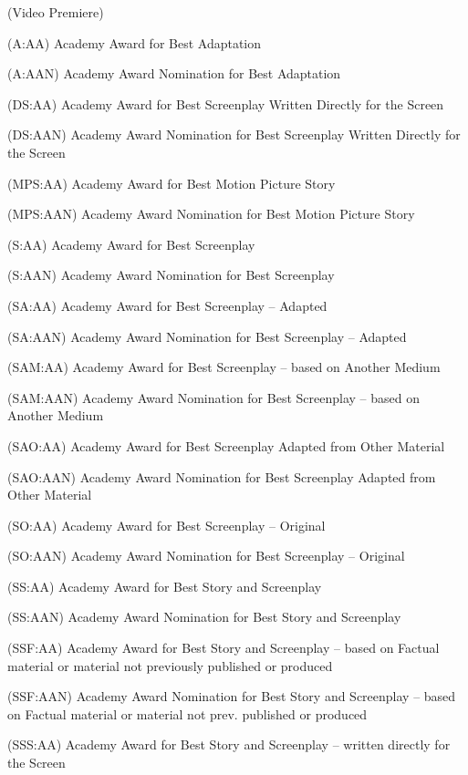 \begin{Ventry}{(Video Premiere)}
\item[(A:AA)]      Academy Award for Best Adaptation
\item[(A:AAN)]     Academy Award Nomination for Best Adaptation
\item[(DS:AA)]     Academy Award for Best Screenplay Written Directly
 for the Screen
\item[(DS:AAN)]    Academy Award Nomination for Best Screenplay Written  
Directly for the Screen
\item[(MPS:AA)]    Academy Award for Best Motion Picture Story
\item[(MPS:AAN)]   Academy Award Nomination for Best Motion Picture Story
\item[(S:AA)]      Academy Award for Best Screenplay
\item[(S:AAN)]     Academy Award Nomination for Best Screenplay
\item[(SA:AA)]     Academy Award for Best Screenplay -- Adapted
\item[(SA:AAN)]    Academy Award Nomination for Best Screenplay -- Adapted
\item[(SAM:AA)]    Academy Award for Best Screenplay -- based on Another Medium
\item[(SAM:AAN)]   Academy Award Nomination for Best Screenplay 
-- based on Another Medium
\item[(SAO:AA)]    Academy Award for Best Screenplay Adapted from Other Material
\item[(SAO:AAN)]   Academy Award Nomination for Best Screenplay Adapted 
from Other Material
\item[(SO:AA)]     Academy Award for Best Screenplay -- Original
\item[(SO:AAN)]    Academy Award Nomination for Best Screenplay -- Original
\item[(SS:AA)]     Academy Award for Best Story and Screenplay
\item[(SS:AAN)]    Academy Award Nomination for Best Story and Screenplay
\item[(SSF:AA)]    Academy Award for Best Story and Screenplay -- based 
on Factual material or material not previously published or produced
\item[(SSF:AAN)]   Academy Award Nomination for Best Story and Screenplay -- 
 based on Factual material or material not prev. published or produced
\item[(SSS:AA)]    Academy Award for Best Story and Screenplay -- written
 directly for the Screen

\end{Ventry}
